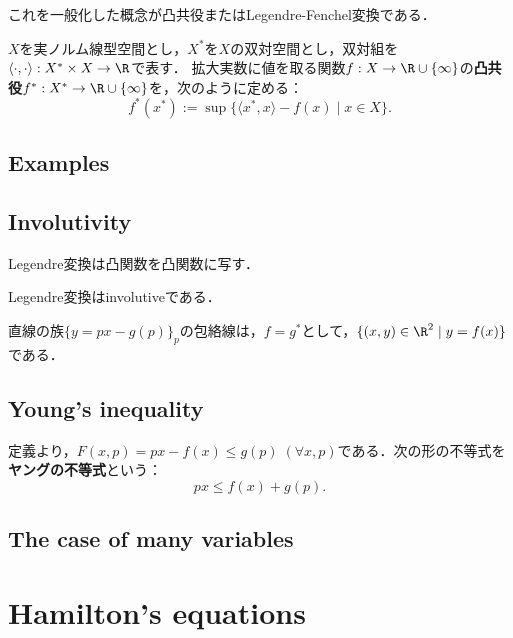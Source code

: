 \documentclass[uplatex, 12pt, dvipdfmx]{jsreport}
\begin{document}
これを一般化した概念が凸共役またはLegendre-Fenchel変換である．

\begin{definition}
    $X$を実ノルム線型空間とし，$X^*$を$X$の双対空間とし，双対組を$\langle\cdot,\cdot\rangle:X^*\times X\to\R$で表す．
    拡大実数に値を取る関数$f:X\to\R\cup\{\infty\}$の\textbf{凸共役}$f^*:X^*\to\R\cup\{\infty\}$を，次のように定める：
    \[ f^*(x^*):=\sup\{\langle x^*,x\rangle-f(x)\mid x\in X\}. \]
\end{definition}

\subsection{Examples}

\subsection{Involutivity}

\begin{proposition}
    Legendre変換は凸関数を凸関数に写す．
\end{proposition}

\begin{theorem}
    Legendre変換はinvolutiveである．
\end{theorem}

\begin{corollary}
    直線の族$\{y=px-g(p)\}_{p}$の包絡線は，$f=g^*$として，$\{(x,y)\in\R^2\mid y=f(x)\}$である．
\end{corollary}

\subsection{Young's inequality}

\begin{definition}
    定義より，$F(x,p)=px-f(x)\le g(p)\;(\forall x,p)$である．次の形の不等式を\textbf{ヤングの不等式}という：
    \[ px\le f(x)+g(p). \]
\end{definition}

\subsection{The case of many variables}

\section{Hamilton's equations}
\end{document}
